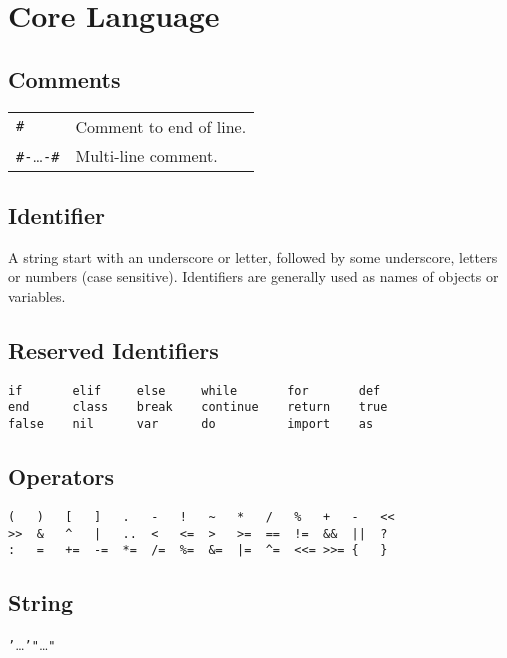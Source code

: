 \section*{Core Language}

\subsection*{Comments}
\begin{tabular}{@{}ll}
\texttt{\#} & Comment to end of line. \\
\texttt{\#-}\dots\texttt{-\#} & Multi-line comment.
\end{tabular}

\subsection*{Identifier}
A string start with an underscore or letter, followed by some underscore, letters or numbers (case sensitive). Identifiers are generally used as names of objects or variables.

\subsection*{Reserved Identifiers}
\begin{lstlisting}[numbers=none]
if       elif     else     while       for       def
end      class    break    continue    return    true
false    nil      var      do          import    as
\end{lstlisting}

\subsection*{Operators}
\begin{lstlisting}[numbers=none]
(   )   [   ]   .   -   !   ~   *   /   %   +   -   <<  
>>  &   ^   |   ..  <   <=  >   >=  ==  !=  &&  ||  ?
:   =   +=  -=  *=  /=  %=  &=  |=  ^=  <<= >>= {   }
\end{lstlisting}

\subsection*{String}
\texttt{'}\dots\texttt{'}\quad\texttt{"}\dots\texttt{"}

